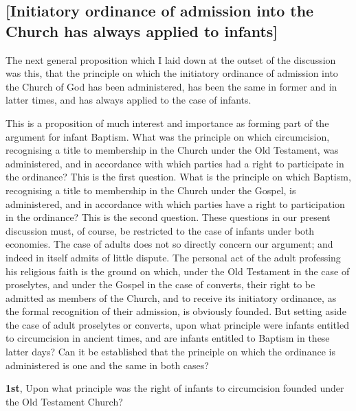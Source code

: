 \documentclass[
  english,
]{book}
\begin{document}
\hypertarget{initiatory-ordinance-of-admission-into-the-church-has-always-applied-to-infants}{%
\subsection{{[}Initiatory ordinance of admission into the Church has always applied to infants{]}}\label{initiatory-ordinance-of-admission-into-the-church-has-always-applied-to-infants}}

The next general proposition which I laid down at the outset of the discussion was this, that the principle on which the initiatory ordinance of admission into the Church of God has been administered, has been the same in former and in latter times, and has always applied to the case of infants.

This is a proposition of much interest and importance as forming part of the argument for infant Baptism. What was the principle on which circumcision, recognising a title to membership in the Church under the Old Testament, was administered, and in accordance with which parties had a right to participate in the ordinance? This is the first question. What is the principle on which Baptism, recognising a title to membership in the Church under the Gospel, is administered, and in accordance with which parties have a right to participation in the ordinance? This is the second question. These questions in our present discussion must, of course, be restricted to the case of infants under both economies. The case of adults does not so directly concern our argument; and indeed in itself admits of little dispute. The personal act of the adult professing his religious faith is the ground on which, under the Old Testament in the case of proselytes, and under the Gospel in the case of converts, their right to be admitted as members of the Church, and to receive its initiatory ordinance, as the formal recognition of their admission, is obviously founded. But setting aside the case of adult proselytes or converts, upon what principle were infants entitled to circumcision in ancient times, and are infants entitled to Baptism in these latter days? Can it be established that the principle on which the ordinance is administered is one and the same in both cases?

\textbf{1st}, Upon what principle was the right of infants to circumcision founded under the Old Testament Church?
\end{document}
